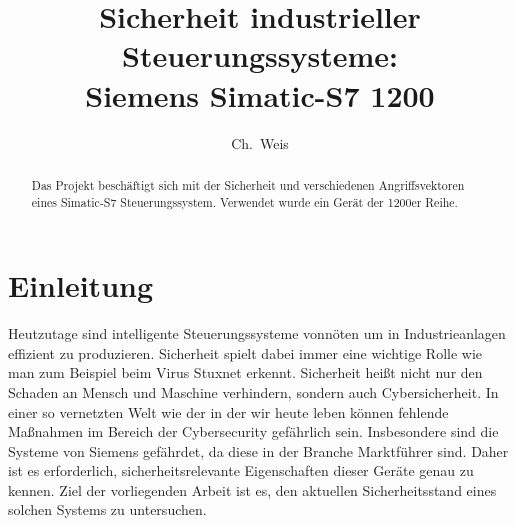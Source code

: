 



\date{}

\title{\Large \bf Sicherheit industrieller Steuerungssysteme:\\
  Siemens Simatic-S7 1200}

\author{
{\rm  Ch.\ Weis}\\
} %

\maketitle

\begin{abstract}
Das Projekt beschäftigt sich mit der Sicherheit und verschiedenen Angriffsvektoren eines Simatic-S7 Steuerungssystem.
Verwendet wurde ein Gerät der 1200er Reihe.
\end{abstract}


\section{Einleitung}

Heutzutage sind intelligente Steuerungssysteme vonnöten um in Industrieanlagen effizient zu produzieren.
Sicherheit spielt dabei immer eine wichtige Rolle wie man zum Beispiel beim Virus Stuxnet erkennt.
Sicherheit heißt nicht nur den Schaden an Mensch und Maschine verhindern, sondern auch Cybersicherheit.
In einer so vernetzten Welt wie der in der wir heute leben können fehlende Maßnahmen im Bereich der Cybersecurity gefährlich sein.
Insbesondere sind die Systeme von Siemens gefährdet, da diese in der Branche Marktführer sind.
Daher ist es erforderlich, sicherheitsrelevante Eigenschaften dieser Geräte genau zu kennen. Ziel der vorliegenden Arbeit ist es, den aktuellen Sicherheitsstand eines solchen Systems zu untersuchen.

